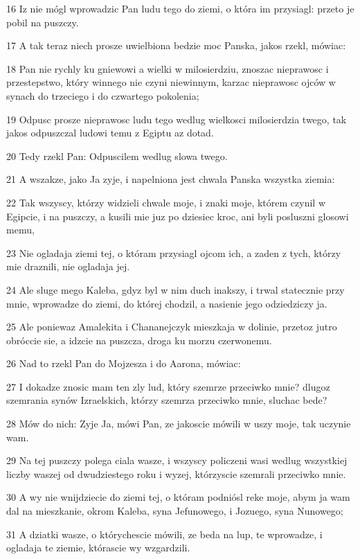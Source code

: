 \par 16 Iz nie mógl wprowadzic Pan ludu tego do ziemi, o która im przysiagl: przeto je pobil na puszczy.
\par 17 A tak teraz niech prosze uwielbiona bedzie moc Panska, jakos rzekl, mówiac:
\par 18 Pan nie rychly ku gniewowi a wielki w milosierdziu, znoszac nieprawosc i przestepstwo, który winnego nie czyni niewinnym, karzac nieprawosc ojców w synach do trzeciego i do czwartego pokolenia;
\par 19 Odpusc prosze nieprawosc ludu tego wedlug wielkosci milosierdzia twego, tak jakos odpuszczal ludowi temu z Egiptu az dotad.
\par 20 Tedy rzekl Pan: Odpuscilem wedlug slowa twego.
\par 21 A wszakze, jako Ja zyje, i napelniona jest chwala Panska wszystka ziemia:
\par 22 Tak wszyscy, którzy widzieli chwale moje, i znaki moje, którem czynil w Egipcie, i na puszczy, a kusili mie juz po dziesiec kroc, ani byli posluszni glosowi memu,
\par 23 Nie ogladaja ziemi tej, o któram przysiagl ojcom ich, a zaden z tych, którzy mie draznili, nie ogladaja jej.
\par 24 Ale sluge mego Kaleba, gdyz byl w nim duch inakszy, i trwal statecznie przy mnie, wprowadze do ziemi, do której chodzil, a nasienie jego odziedziczy ja.
\par 25 Ale poniewaz Amalekita i Chananejczyk mieszkaja w dolinie, przetoz jutro obróccie sie, a idzcie na puszcza, droga ku morzu czerwonemu.
\par 26 Nad to rzekl Pan do Mojzesza i do Aarona, mówiac:
\par 27 I dokadze znosic mam ten zly lud, który szemrze przeciwko mnie? dlugoz szemrania synów Izraelskich, którzy szemrza przeciwko mnie, sluchac bede?
\par 28 Mów do nich: Zyje Ja, mówi Pan, ze jakoscie mówili w uszy moje, tak uczynie wam.
\par 29 Na tej puszczy polega ciala wasze, i wszyscy policzeni wasi wedlug wszystkiej liczby waszej od dwudziestego roku i wyzej, którzyscie szemrali przeciwko mnie.
\par 30 A wy nie wnijdziecie do ziemi tej, o któram podniósl reke moje, abym ja wam dal na mieszkanie, okrom Kaleba, syna Jefunowego, i Jozuego, syna Nunowego;
\par 31 A dziatki wasze, o którychescie mówili, ze beda na lup, te wprowadze, i ogladaja te ziemie, którascie wy wzgardzili.
